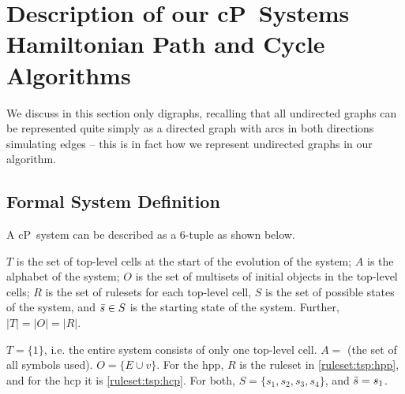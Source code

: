 \section{\label{sec:tsp:algohpp}Description of our cP~Systems Hamiltonian Path and Cycle Algorithms}
We discuss in this section only digraphs, recalling that all undirected graphs can be represented quite simply as a directed graph with arcs in both directions simulating edges -- this is in fact how we represent undirected graphs in our algorithm.

\subsection{Formal System Definition}
A cP~system can be described as a 6-tuple as shown below.


\cptupletemplate{}

\(T\) is the set of top-level cells at the start of the evolution of the system; \(A\) is the alphabet of the system; \(O\) is the set of multisets of initial objects in the top-level cells; \(R\) is the set of rulesets for each top-level cell, \(S\) is the set of possible states of the system, and \(\Bar{s} \in S\) is the starting state of the system. Further, \(|T| = |O| = |R|\).

\(T = \{1\}\), i.e. the entire system consists of only one top-level cell.  \(A = \) (the set of all symbols used).  \(O = \{E \cup v\}\).  For the \gls{hpp}, \(R\) is the ruleset in \autoref{ruleset:tsp:hpp}, and for the \gls{hcp} it is \autoref{ruleset:tsp:hcp}.  For both, \(S = \{s_1, s_2, s_3, s_4\}\), and \(\Bar{s} = s_1\).






